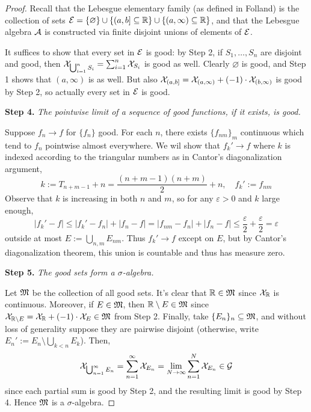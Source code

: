 \begin{proof}
    Recall that the Lebesgue elementary family (as defined in Folland) is the collection of sets \(\mathcal{E} = \{ \varnothing \} \cup \{ (a, b] \subseteq \mathbb{R} \} \cup \{ (a, \infty) \subseteq \mathbb{R} \}\), and that the Lebesgue algebra \(\mathcal{A}\) is constructed via finite disjoint unions of elements of \(\mathcal{E}\). 
    
    It suffices to show that every set in \(\mathcal{E}\) is good: by Step 2, if \(S_1, \dots, S_n\) are disjoint and good, then \(\mathcal{X}_{\bigcup_{i=1}^n S_i} = \sum_{i=1}^n \mathcal{X}_{S_i}\) is good as well. Clearly \(\varnothing\) is good, and Step 1 shows that \((a, \infty)\) is as well. But also \(\mathcal{X}_{(a, b]} = \mathcal{X}_{(a, \infty)} + (-1) \cdot \mathcal{X}_{(b, \infty)}\) is good by Step 2, so actually every set in \(\mathcal{E}\) is good. 

    \textbf{Step 4.} \textit{The pointwise limit of a sequence of good functions, if it exists, is good.}

    Suppose \(f_n \to f\) for \(\{f_n\}\) good. For each \(n\), there exists \(\{f_{nm}\}_m\) continuous which tend to \(f_n\) pointwise almost everywhere. We wil show that \(f_k' \to f\) where \(k\) is indexed according to the triangular numbers as in Cantor's diagonalization argument, 
    \[
    k := T_{n+m-1} + n = \frac{(n+m-1)(n+m)}{2} + n, 
    \quad 
    f_k' := f_{nm}
    \]
    Observe that \(k\) is increasing in both \(n\) and \(m\), so for any \(\varepsilon > 0\) and \(k\) large enough, 
    \[
    |f_k' - f| 
    \leq |f_k' - f_n| + |f_n - f|
    = |f_{nm} - f_n| + |f_n - f|
    \leq \frac{\varepsilon}{2} + \frac{\varepsilon}{2}
    = \varepsilon
    \]
    outside at most \(E := \bigcup_{n,m} E_{nm}\). Thus \(f_k' \to f\) except on \(E\), but by Cantor's diagonalization theorem, this union is countable and thus has measure zero. 

    \textbf{Step 5.} \textit{The good sets form a \(\sigma\)-algebra.}

    Let \(\mathfrak{M}\) be the collection of all good sets. It's clear that \(\mathbb{R} \in \mathfrak{M}\) since \(\mathcal{X}_{\mathbb{R}}\) is continuous. Moreover, if \(E \in \mathfrak{M}\), then \(\mathbb{R} \setminus E \in \mathfrak{M}\) since \(\mathcal{X}_{\mathbb{R} \setminus E} = \mathcal{X}_{\mathbb{R}} + (-1) \cdot \mathcal{X}_E \in \mathfrak{M}\) from Step 2. Finally, take \(\{E_n\}_n \subseteq \mathfrak{M}\), and without loss of generality suppose they are pairwise disjoint (otherwise, write \(E_n' := E_n \setminus \bigcup_{k<n}E_k\)). Then, 
    \[
    \mathcal{X}_{\bigcup_{n=1}^\infty E_n} 
    = \sum_{n=1}^\infty \mathcal{X}_{E_n} 
    = \lim_{N \to \infty} \sum_{n=1}^N \mathcal{X}_{E_n}
    \in \mathcal{G}
    \]
    since each partial sum is good by Step 2, and the resulting limit is good by Step 4. Hence \(\mathfrak{M}\) is a \(\sigma\)-algebra. 


\end{proof}
